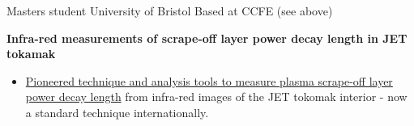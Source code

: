 \documentclass[12pt,a4paper,sans]{moderncv}        %
\begin{document}
{\textcolor{mypurple}{Masters student} }%
{University of Bristol}%
{%
\small Based at CCFE (see above)}%
{} %
{\normalsize{\textbf{{Infra-red measurements of scrape-off layer power decay length in JET tokamak}}}
\begin{itemize}%
\item \href{https://iopscience.iop.org/article/10.1088/0029-5515/53/7/073016/meta}{\textcolor{mypurple}{Pioneered technique} and analysis tools to measure plasma scrape-off layer power decay length} from infra-red images of the JET tokomak interior - now a \textcolor{mypurple}{standard technique internationally}.
\end{itemize}
}
\end{document}

